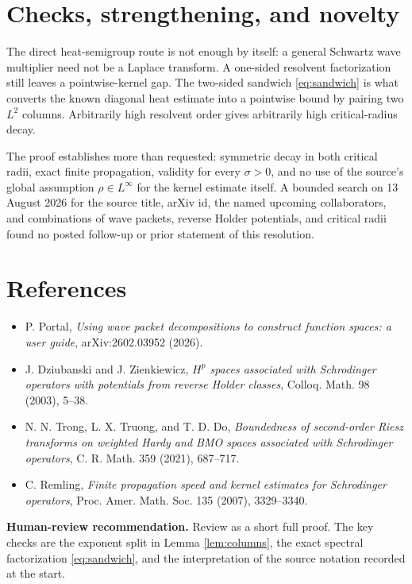 \documentclass[11pt]{article}
\newcommand{\1}{\mathbf 1}
\begin{document}
\section*{Checks, strengthening, and novelty}

The direct heat-semigroup route is not enough by itself: a general Schwartz
wave multiplier need not be a Laplace transform. A one-sided resolvent
factorization still leaves a pointwise-kernel gap. The two-sided sandwich
\eqref{eq:sandwich} is what converts the known diagonal heat estimate into a
pointwise bound by pairing two \(L^2\) columns. Arbitrarily high resolvent
order gives arbitrarily high critical-radius decay.

The proof establishes more than requested: symmetric decay in both critical
radii, exact finite propagation, validity for every \(\sigma>0\), and no use
of the source's global assumption \(\rho\in L^\infty\) for the kernel estimate
itself. A bounded search on 13 August 2026 for the source title, arXiv id,
the named upcoming collaborators, and combinations of wave packets, reverse
Holder potentials, and critical radii found no posted follow-up or prior
statement of this resolution.

\section*{References}

\begin{itemize}[leftmargin=2em,nosep]
\item P. Portal, \emph{Using wave packet decompositions to construct function
spaces: a user guide}, arXiv:2602.03952 (2026).
\item J. Dziubanski and J. Zienkiewicz, \emph{\(H^p\) spaces associated with
Schrodinger operators with potentials from reverse Holder classes}, Colloq.
Math. 98 (2003), 5--38.
\item N. N. Trong, L. X. Truong, and T. D. Do, \emph{Boundedness of
second-order Riesz transforms on weighted Hardy and BMO spaces associated
with Schrodinger operators}, C. R. Math. 359 (2021), 687--717.
\item C. Remling, \emph{Finite propagation speed and kernel estimates for
Schrodinger operators}, Proc. Amer. Math. Soc. 135 (2007), 3329--3340.
\end{itemize}

\medskip
\noindent\textbf{Human-review recommendation.}
Review as a short full proof. The key checks are the exponent split in
Lemma \ref{lem:columns}, the exact spectral factorization
\eqref{eq:sandwich}, and the interpretation of the source notation recorded
at the start.
\end{document}
